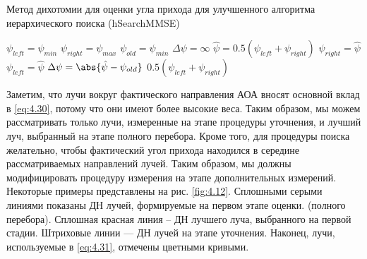\begin{algorithm}
    \caption{Метод дихотомии для оценки угла прихода для улучшенного алгоритма иерархического поиска (hSearchMMSE)}
    \label{lst:4.1}
    \begin{algorithmic}
        \State $\psi_{left} = \psi_{min}$
        \State $\psi_{right} = \psi_{max}$
        \State $\psi_{old} = \psi_{min}$
        \State $\Delta \psi = \infty$
        \While{$\Delta \psi > \epsilon$}
        \State $\hat \psi = 0.5 (\psi_{left} + \psi_{right})$
        \State $\psi_{right} = \hat\psi$
        \Else
        \State $\psi_{left} = \hat\psi$
        \EndIf
        \State $\Delta \psi = \abs{\hat \psi - \psi_{old}}$
        \EndWhile
        \State \Return $0.5(\psi_{left} + \psi_{right})$
    \end{algorithmic}
\end{algorithm}

Заметим, что лучи вокруг фактического направления АОА вносят основной вклад в
\eqref{eq:4.30}, потому что они имеют более высокие веса. Таким образом, мы
можем рассматривать только лучи, измеренные на этапе процедуры уточнения, и
лучший луч, выбранный на этапе полного перебора. Кроме того, для
процедуры поиска желательно, чтобы фактический угол прихода находился в середине
рассматриваемых направлений лучей. Таким образом, мы должны модифицировать
процедуру измерения на этапе дополнительных измерений. Некоторые примеры
представлены на рис.  \ref{fig:4.12}.
Сплошными серыми линиями показаны ДН лучей, формируемые на первом этапе оценки.
(полного перебора). Сплошная красная линия -- ДН лучшего луча,
выбранного на первой стадии. Штриховые линии — ДН лучей на этапе
уточнения. Наконец, лучи, используемые в \eqref{eq:4.31}, отмечены цветными кривыми.

